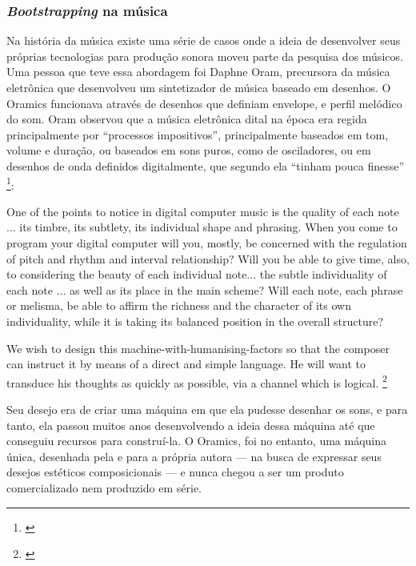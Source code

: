 \subsubsection{\emph{Bootstrapping} na música}

Na história da música existe uma série de casos onde a ideia de desenvolver seus próprias tecnologias para produção sonora moveu parte da pesquisa dos músicos. Uma pessoa que teve essa abordagem foi Daphne Oram, precursora da música eletrônica que desenvolveu um sintetizador de música baseado em desenhos. O Oramics funcionava através de desenhos que definiam envelope, e perfil melódico do som. Oram observou que a música eletrônica dital na época era regida principalmente por ``processos impositivos'', principalmente baseados em tom, volume e duração, ou baseados em sons puros, como de osciladores, ou em desenhos de onda definidos digitalmente, que segundo ela ``tinham pouca finesse'' \footnote{\cite[101]{Oram1972}}: 

\begin{citacao}
One of the points to notice in digital computer music is the
quality of each note ... its timbre, its subtlety, its individual shape and phrasing. When you come to program your digital computer will you, mostly, be concerned with the regulation of pitch and rhythm and interval relationship? Will you be able to give time, also, to considering the beauty of each individual note... the subtle individuality of each note ... as well as its place in the main scheme? Will each note, each phrase or melisma, be able to affirm the richness and the character of its own individuality, while it is taking its balanced position in the overall structure? 

We wish to design this machine-with-humanising-factors so that the composer can instruct it by means of a direct and simple language. He will want to transduce his thoughts as quickly as possible, via a channel which is logical. \footnote{\cite[97]{Oram1972}}
\end{citacao}

Seu desejo era de criar uma máquina em que ela pudesse desenhar os sons, e para tanto, ela passou muitos anos desenvolvendo a ideia dessa máquina até que conseguiu recursos para construí-la. O Oramics, foi no entanto, uma máquina única, desenhada pela e para a própria autora --- na busca de expressar seus desejos estéticos composicionais --- e nunca chegou a ser um produto comercializado nem produzido em série.   

